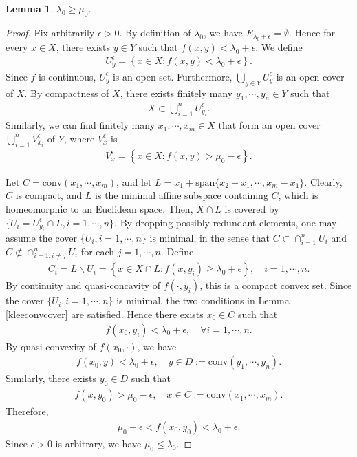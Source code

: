 \documentclass{article}
\numberwithin{equation}{section}
\newtheorem{lemma}[theorem]{Lemma}
\begin{document}
\begin{lemma}\label{strongdual}
	$\lambda_0\geq\mu_0$.
\end{lemma}
\begin{proof}
Fix arbitrarily $\epsilon>0$. By definition of $\lambda_0$, we have $E_{\lambda_0+\epsilon}=\emptyset$. Hence for every $x\in X$, there exists $y\in Y$ such that $f(x,y)<\lambda_0+\epsilon$. We define
\begin{align*}
	U_y^\epsilon=\left\{x\in X:f(x,y)<\lambda_0+\epsilon\right\}.
\end{align*}
Since $f$ is continuous, $U_y^\epsilon$ is an open set. Furthermore, $\bigcup_{y\in Y}U_y^\epsilon$ is an open cover of $X$. By compactness of $X$, there exists finitely many $y_1,\cdots,y_n\in Y$ such that
\begin{align*}
	X\subset\bigcup_{i=1}^n U_{y_i}^\epsilon.
\end{align*}
Similarly, we can find finitely many $x_1,\cdots,x_m\in X$ that form an open cover $\bigcup_{i=1}^n V_{x_i}^\epsilon$ of $Y$, where $V_x^\epsilon$ is
\begin{align*}
	V_x^\epsilon=\left\{x\in X:f(x,y)>\mu_0-\epsilon\right\}.
\end{align*}
	
Let $C=\mathrm{conv}(x_1,\cdots,x_m)$, and let $L=x_1+\mathrm{span}\{x_2-x_1,\cdots,x_m-x_1\}$. Clearly, $C$ is compact, and $L$ is the minimal affine subspace containing $C$, which is homeomorphic to an Euclidean space. Then, $X\cap L$ is covered by $\{U_i=U_{y_i}^\epsilon\cap L,i=1,\cdots,n\}$. By dropping possibly redundant elements, one may assume the cover $\{U_i,i=1,\cdots,n\}$ is minimal, in the sense that $C\subset\cap_{i=1}^n U_i$ and $C\not\subset\cap_{i=1,i\neq j}^n U_i$ for each $j=1,\cdots,n$. Define
\begin{align*}
	C_i = L\backslash U_i =\left\{x\in X\cap L:f(x,y_i)\geq\lambda_0+\epsilon\right\},\quad i=1,\cdots,n.
\end{align*}
By continuity and quasi-concavity of $f(\cdot,y_i)$, this is a compact convex set. Since the cover $\{U_i,i=1,\cdots,n\}$ is minimal, the two conditions in Lemma \ref{kleeconvcover} are satisfied. Hence there exists $x_0\in C$ such that
\begin{align*}
	f(x_0,y_i)<\lambda_0+\epsilon,\quad\forall i=1,\cdots,n.
\end{align*}
By quasi-convexity of $f(x_0,\cdot)$, we have
\begin{align*}
	f(x_0,y)<\lambda_0+\epsilon,\quad y\in D:=\mathrm{conv}(y_1,\cdots,y_n).
\end{align*}
Similarly, there exists $y_0\in D$ such that
\begin{align*}
	f(x,y_0)>\mu_0-\epsilon,\quad x\in C:=\mathrm{conv}(x_1,\cdots,x_m).
\end{align*}
Therefore,
\begin{align*}
	\mu_0-\epsilon<f(x_0,y_0)<\lambda_0+\epsilon.
\end{align*}
Since $\epsilon>0$ is arbitrary, we have $\mu_0\leq\lambda_0$.
\end{proof}
\end{document}
